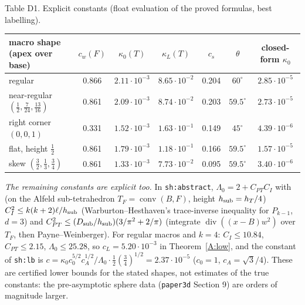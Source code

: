 \documentclass[11pt,reqno]{amsart}
\theoremstyle{plain}
\theoremstyle{definition}
\renewcommand{\div}{\operatorname{div}}
\DeclareMathOperator{\conv}{conv}
\begin{document}
\begin{center}\small
Table D1. Explicit constants (float evaluation of the proved formulas, best labelling).\\[2pt]
\begin{tabular}{lcccccc}
\toprule
macro shape (apex over base) & $c_w(F)$ & $\kappa_0(T)$ & $\kappa_L(T)$ & $c_s$ & $\theta$ & closed-form $\kappa_0$\\
\midrule
regular & 0.866 & $2.11\cdot10^{-3}$ & $8.65\cdot10^{-2}$ & 0.204 & $60^\circ$ & $2.85\cdot10^{-5}$\\
near-regular $(\frac12,\frac7{24},\frac{13}{16})$ & 0.861 & $2.09\cdot10^{-3}$ & $8.74\cdot10^{-2}$ & 0.203 & $59.5^\circ$ & $2.73\cdot10^{-5}$\\
right corner $(0,0,1)$ & 0.331 & $1.52\cdot10^{-3}$ & $1.63\cdot10^{-1}$ & 0.149 & $45^\circ$ & $4.39\cdot10^{-6}$\\
flat, height $\frac12$ & 0.861 & $1.79\cdot10^{-3}$ & $1.18\cdot10^{-1}$ & 0.166 & $59.5^\circ$ & $1.57\cdot10^{-5}$\\
skew $(\frac32,\frac13,\frac34)$ & 0.861 & $1.33\cdot10^{-3}$ & $7.73\cdot10^{-2}$ & 0.095 & $59.5^\circ$ & $3.40\cdot10^{-6}$\\
\bottomrule
\end{tabular}
\end{center}
\emph{The remaining constants are explicit too.} In \texttt{sh:abstract}, $\Lambda_0=2+C_{PT}C_I$ with (on the Alfeld sub-tetrahedron $T_F=\conv(B,F)$, height $h_{\rm sub}=h_T/4$) $C_I^2\le k(k+2)\ell/h_{\rm sub}$ (Warburton--Hesthaven's trace-inverse inequality for $P_{k-1}$, $d=3$) and $C_{PT}^2\le(D_{\rm sub}/h_{\rm sub})(3/\pi^2+2/\pi)$ (integrate $\div((x-B)w^2)$ over $T_F$, then Payne--Weinberger). For regular macros and $k=4$: $C_I\le10.84$, $C_{PT}\le2.15$, $\Lambda_0\le25.28$, so $c_L=5.20\cdot10^{-3}$ in Theorem~\ref{A:low}, and the constant of \texttt{sh:lb} is $c=\kappa_0c_0^{5/2}c_A^{1/2}/\Lambda_0\cdot\frac12(\frac34)^{1/2}=2.37\cdot10^{-5}$ ($c_0=1$, $c_A=\sqrt3/4$). These are certified lower bounds for the stated shapes, not estimates of the true constants: the pre-asymptotic sphere data (\texttt{paper3d} Section 9) are orders of magnitude larger.
\end{document}
